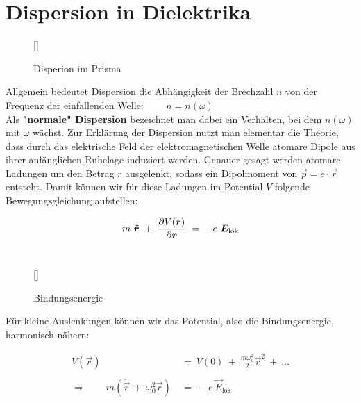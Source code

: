 \section{Dispersion in Dielektrika}
\begin{wrapfigure}[]{r}[0cm]{0cm}
	\raisebox{0pt}[\dimexpr{}\baselineskip\relax]{
		\colorbox{hgrey}{
		}
	}
	\caption{Disperion im Prisma}
\end{wrapfigure}
Allgemein bedeutet Dispersion die Abhängigkeit der Brechzahl $n$ von der Frequenz der einfallenden Welle: $\qquad n = n (\omega)$\\
Als \textbf{"normale" Dispersion} bezeichnet man dabei ein Verhalten, bei dem $n(\omega)$ mit $\omega$ wächst.
Zur Erklärung der Dispersion nutzt man elementar die Theorie, dass  durch das elektrische Feld der elektromagnetischen Welle atomare Dipole aus ihrer anfänglichen Ruhelage induziert werden. Genauer gesagt werden atomare Ladungen um den Betrag $r$ ausgelenkt, sodass ein Dipolmoment von $\vec{p}=e\cdot\vec{r}$ entsteht. Damit können  wir für diese Ladungen im Potential $V$ folgende Bewegungsgleichung aufstellen:

\begin{equation*}
m \ \ddot{\vec{r}} \ + \ \pdiff{V(\vec{r})}{\vec{r}} \ = \ -e \ \vec{E}_{\text{lok}}
\end{equation*}
\ \\
\begin{wrapfigure}[10]{l}[0cm]{0cm}
	\raisebox{0pt}[\dimexpr{}\baselineskip\relax]{
		\colorbox{hgrey}{
		}
	}
	\caption{Bindungsenergie}
\end{wrapfigure}
Für kleine Auslenkungen können wir das Potential, also die Bindungsenergie, harmonisch nähern:

\begin{align*}
V(\vec{r})  \ &= \ V(0) \ + \ \frac{m\omega_0^2}{2}\vec{r}^2 \ + \ \ldots\\
\ \\
\Rightarrow \qquad m \left(\ddot{\vec{r}} \ + \ \omega_0^2\vec{r}\right)  \ &= \ - e \ \vec{E}_{\text{lok}}
\end{align*}

